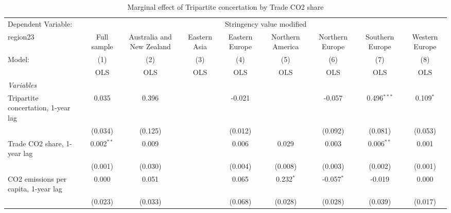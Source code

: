
\begin{table}[htbp]
   \caption{Marginal effect of Tripartite concertation by Trade CO2 share}
   \centering
   \begin{tabular}{lcccccccc}
      \toprule
      Dependent Variable: & \multicolumn{8}{c}{Stringency value modified}\\
      region23                                                          & Full sample    & Australia and New Zealand & Eastern Asia & Eastern Europe & Northern America & Northern Europe & Southern Europe & Western Europe \\   
      Model:                                                            & (1)            & (2)                       & (3)          & (4)            & (5)              & (6)             & (7)             & (8)\\  
                                                                        &  OLS           & OLS                       & OLS          & OLS            & OLS              & OLS             & OLS             & OLS\\  
      \midrule
      \emph{Variables}\\
      Tripartite concertation, 1-year lag                               & 0.035          & 0.396                     &              & -0.021         &                  & -0.057          & 0.496$^{***}$   & 0.109$^{*}$\\   
                                                                        & (0.034)        & (0.125)                   &              & (0.012)        &                  & (0.092)         & (0.081)         & (0.053)\\   
      Trade CO2 share, 1-year lag                                       & 0.002$^{**}$   & 0.009                     &              & 0.006          & 0.029            & 0.003           & 0.006$^{**}$    & 0.001\\   
                                                                        & (0.001)        & (0.030)                   &              & (0.004)        & (0.008)          & (0.003)         & (0.002)         & (0.001)\\   
      CO2 emissions per capita, 1-year lag                              & 0.000          & 0.051                     &              & 0.065          & 0.232$^{*}$      & -0.057$^{*}$    & -0.019          & 0.000\\   
                                                                        & (0.023)        & (0.033)                   &              & (0.068)        & (0.028)          & (0.028)         & (0.039)         & (0.017)\\   

\end{tabular}
\end{table}
